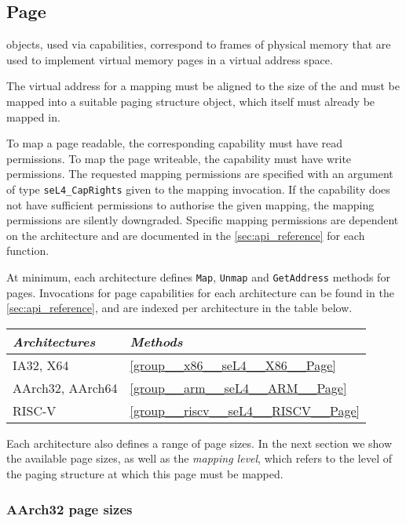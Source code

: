 \subsection{Page}

 objects, used via  capabilities, correspond to frames of physical memory that
are used to implement virtual memory pages in a virtual address space.

The virtual address for a  mapping must be aligned to the size of the  and must
be mapped into a suitable paging structure object, which itself must already be mapped in.

To map a page readable, the corresponding  capability must have read permissions. To map
the page writeable, the capability must have write permissions. The requested mapping permissions
are specified with an argument of type \texttt{seL4\_CapRights} given to the mapping invocation. If
the capability does not have sufficient permissions to authorise the given mapping, the mapping
permissions are silently downgraded. Specific mapping permissions are dependent on the architecture
and are documented in the \autoref{sec:api_reference} for each function.

At minimum, each architecture defines \texttt{Map}, \texttt{Unmap} and
\texttt{GetAddress} methods for pages.
Invocations for page capabilities for each architecture can be found in the \autoref{sec:api_reference}, and
are indexed per architecture in the table below.

\begin{tabularx}{\textwidth}{Xl} \toprule
\emph{Architectures} & \emph{Methods} \\ \midrule
IA32, X64            & \autoref{group__x86__seL4__X86__Page} \\
AArch32, AArch64     & \autoref{group__arm__seL4__ARM__Page} \\
    RISC-V           & \autoref{group__riscv__seL4__RISCV__Page} \\
\bottomrule
\end{tabularx}

Each architecture also defines a range of page sizes. In the next section we show the available page
sizes, as well as the \emph{mapping level}, which refers to
the level of the paging structure at which this page must be mapped.

\subsubsection{AArch32 page sizes}

